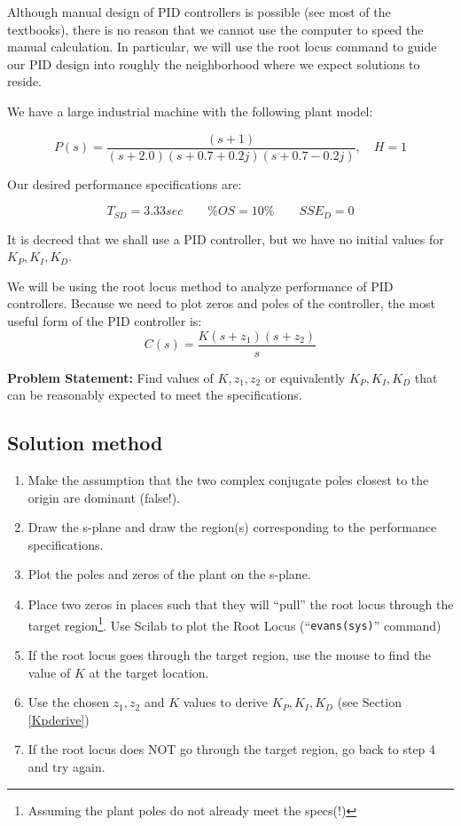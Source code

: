 Although manual design of PID controllers is possible (see most of the textbooks), there is no reason that we cannot use the computer to speed the manual calculation.   In particular, we will use the root locus command to guide our PID design into roughly the neighborhood where we expect solutions to reside. 



\begin{Example}

We have a large industrial machine with the following plant model:

\[
P(s) = \frac {(s+1)} {(s+2.0)(s+0.7+0.2j)(s+0.7-0.2j)}, \quad H=1
\]
 

Our desired performance specifications are:

\[
T_{SD} = 3.33 sec  \qquad 
\%OS = 10\%        \qquad
SSE_D = 0
\] 

It is decreed that we shall use a PID controller, but we have no initial values for $K_P, K_I, K_D$. 

We will be using the root locus method to analyze performance of PID controllers.  Because we need to plot zeros and poles of the controller,  the most useful form of the PID controller is:
\[
C(s) = \frac{K(s+z_1)(s+z_2)}{s}
\]


{\bf Problem Statement: }  Find values of $K, z_1, z_2$ or equivalently $K_P, K_I, K_D$ that can be reasonably expected to meet the specifications. 


\subsection{Solution method}

\begin{enumerate}
 \item Make the assumption that the two complex conjugate poles closest to the origin are dominant (false!).
 \item Draw the s-plane and draw the region(s) corresponding to the performance specifications.
 \item Plot the poles and zeros of the plant on the s-plane.
 \item Place two zeros in places such that they will ``pull'' the root locus through the target region\footnote{Assuming the plant poles do not already meet the specs(!)}. Use Scilab to plot the Root Locus (``{\tt evans(sys)}'' command)
  \item If the root locus goes through the target region, use the mouse to find the value of $K$ at the target location.
  \item Use the chosen $z_1, z_2$ and $K$ values to derive  $K_P, K_I, K_D$ (see Section \ref{Kpderive})
  \item If the root locus does NOT go through the target region, go back to step 4 and try again. 
\end{enumerate} 

\end{Example}

